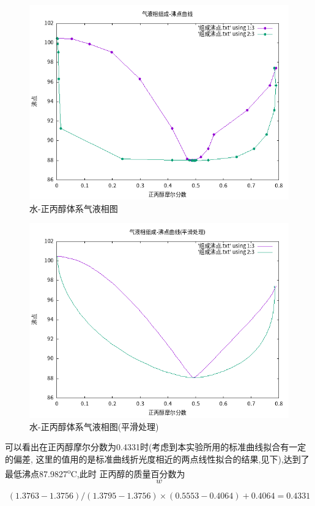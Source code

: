 \documentclass[11pt]{report}
\begin{document}
\begin{figure}[htbp]
\centering
\includegraphics[width=.9\linewidth]{../data/气液相组成-沸点曲线.png}
\caption{\label{fig:orgefd6169}水-正丙醇体系气液相图}
\end{figure}

\begin{figure}[htbp]
\centering
\includegraphics[width=.9\linewidth]{../data/气液相组成-沸点曲线(平滑处理).png}
\caption{\label{fig:org8cbb44f}水-正丙醇体系气液相图(平滑处理)}
\end{figure}




可以看出在正丙醇摩尔分数为0.4331时(考虑到本实验所用的标准曲线拟合有一定的偏差,
这里的值用的是标准曲线折光度相近的两点线性拟合的结果,见下),达到了最低沸点87.9827\textsuperscript{o}C,此时
正丙醇的质量百分数为
\[
    w%
    \]

\[
    (1.3763-1.3756)/(1.3795-1.3756)\times (0.5553-0.4064)+0.4064=0.4331
    \]
\end{document}
